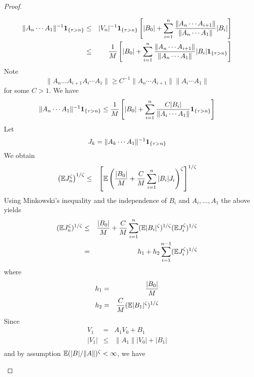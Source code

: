 \documentclass{article}
\theoremstyle{remark}
\begin{document}
\begin{proof}
\begin{enumerate}
\begin{eqnarray*}
      \|A_n \cdots A_1\|^{-1} \mathbf{1}_{\{\tau > n\}}
      &\leq& |V_n|^{-1} \mathbf{1}_{\{\tau > n\}}
      \left[
        |B_0| + \sum_{i=1}^n {
          \|A_n \cdots A_{i+1}\|
          \over
          \|A_n \cdots A_{1}\|
        } |B_i|
      \right] \\
      &\leq& {1 \over M}
      \left[
        |B_0| + \sum_{i=1}^n {
          \|A_n \cdots A_{i+1}\|
          \over
          \|A_n \cdots A_{1}\|
        } |B_i| \mathbf{1}_{\{\tau > n\}}
      \right]
    \end{eqnarray*}
    Note
    \[
    \|A_n \dots A_{i+1} A_i \cdots A_1\| \geq
    C^{-1} \|A_n \cdots A_{i+1}\|
    \|A_i \cdots A_{1}\|
    \]
    for some $C > 1$. We have
    \begin{equation}
      \label{eq:lower_bound}
      \|A_n \cdots A_1\|^{-1} \mathbf{1}_{\{\tau > n\}}
      \leq
      {1 \over M} \left[
        |B_0| + \sum_{i=1}^n {
          C |B_i|
          \over
          \|A_i \cdots A_1\|
        }  \mathbf{1}_{\{\tau > n\}}
      \right]
    \end{equation}
    Let
    \[
    J_k = \|A_k \cdots A_1\|^{-1} \mathbf{1}_{\{\tau > n\}}
    \]
    We obtain
    \begin{eqnarray*}
      \left(
        \mathbb{E} J_n^\zeta
      \right)^{1/\zeta} &\leq& \left[
        \mathbb{E} \left(
          {|B_0| \over M}
          + {C \over M} \sum_{i=1}^n |B_i| J_i
        \right)^\zeta
        \right]^{1/\zeta}
    \end{eqnarray*}
    Using Minkowski's inequality and the independence of $B_i$ and
    $A_i, \dots, A_1$ the above yields
    \begin{eqnarray}
      (\mathbb{E} J_n^\zeta)^{1/\zeta} &\leq&
      {|B_0| \over M} + {C \over M}
      \sum_{i=1}^n
      (\mathbb{E} |B_i|^\zeta)^{1/\zeta}
      (\mathbb{E} J_i^\zeta)^{1/\zeta}
      \label{eq:neg_pow_ub} \\
      &=& h_1 + h_2 \sum_{i=1}^{n-1} (\mathbb{E} J_i^\zeta)^{1/\zeta}
      \nonumber
    \end{eqnarray}
    where
    \begin{eqnarray*}
      h_1 &=& {|B_0| \over M} \\
      h_2 &=& {C \over M} (\mathbb{E} |B_1|^\zeta)^{1/\zeta}
    \end{eqnarray*}
    Since
    \begin{eqnarray*}
      V_1 &=& A_1 V_0 + B_1 \\
      |V_1| &\leq& \|A_1\| |V_0| + |B_1| \\
      \end{eqnarray*}
      and by assumption $\mathbb{E} (|B|/\|A\|)^\zeta < \infty$, we have

\end{enumerate}
\end{proof}
\end{document}
